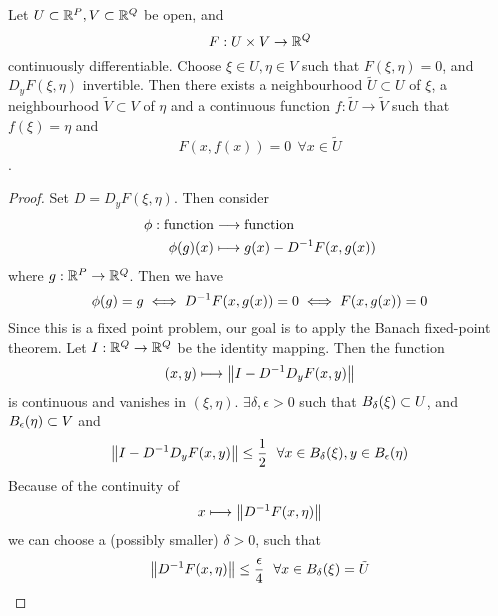 \documentclass[../../script.tex]{subfiles}
\begin{document}
\begin{thm}
    Let $U \subset \realn^P, V \subset \realn^Q$ be open, and \[F: U \times V \rightarrow \realn^Q\] continuously differentiable.
    Choose $\xi \in U, \eta \in V$ such that $F(\xi, \eta) = 0$, and $D_y F(\xi, \eta)$ invertible.
    Then there exists a neighbourhood $\tilde{U} \subset U$ of $\xi$, a neighbourhood $\tilde{V} \subset V$ of $\eta$ and 
    a continuous function $f: \tilde{U} \rightarrow \tilde{V}$ such that $f(\xi) = \eta$ and \[F(x, f(x)) = 0 ~~\forall x \in \tilde{U}\].
\end{thm}
\begin{proof}
    Set $D = D_yF(\xi, \eta)$. Then consider 
    \begin{equation}
        \begin{split}
            \phi: \text{function} &\longrightarrow \text{function} \\
            \phi(g)(x) &\longmapsto g(x) - \inv{D}F(x, g(x))
        \end{split}
    \end{equation}
    where $g: \realn^P \rightarrow \realn^Q$. Then we have 
    \begin{equation}
        \phi(g) = g \iff \inv{D}F(x, g(x)) = 0 \iff F(x, g(x)) = 0
    \end{equation}
    Since this is a fixed point problem, our goal is to apply the Banach fixed-point theorem.
    Let $I: \realn^Q \rightarrow \realn^Q$ be the identity mapping. Then the function 
    \begin{equation}
        (x, y) \longmapsto \norm{I - \inv{D}D_yF(x, y)}
    \end{equation}
    is continuous and vanishes in $(\xi, \eta)$.
    $\exists \delta, \epsilon > 0$ such that $\oball[\delta](\xi) \subset U$, and $\oball(\eta) \subset V$ and 
    \begin{equation}
        \norm{I - \inv{D}D_yF(x, y)} \le \frac{1}{2} ~~\forall x \in \oball[\delta](\xi), y \in \oball(\eta)
    \end{equation}
    Because of the continuity of 
    \begin{equation}
        x \longmapsto \norm{\inv{D} F(x, \eta)}
    \end{equation}
    we can choose a (possibly smaller) $\delta > 0$, such that 
    \begin{equation}
        \norm{\inv{D}F(x, \eta)} \le \frac{\epsilon}{4} ~~\forall x \in \oball[\delta](\xi) = \tilde{U}
    \end{equation}

\end{proof}
\end{document}
